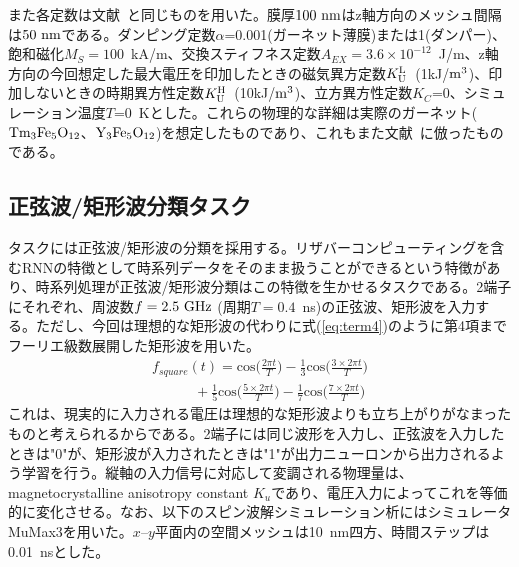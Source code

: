 \documentclass[a4j, twocolumn]{jsarticle}
\begin{document}
また各定数は文献~\cite{Nakane2018IEEEAccess:_Reser_Compu_with_spin_waves_Excit_in_a_Garne_film}と同じものを用いた。膜厚$100~\rm{nm}$はz軸方向のメッシュ間隔は$50~\rm{nm}$である。ダンピング定数$\alpha$=0.001(ガーネット薄膜)または1(ダンパー)、飽和磁化$M_S=100$~kA/m、交換スティフネス定数$A_{EX}=3.6\times10^{-12}$~J/m、z軸方向の今回想定した最大電圧を印加したときの磁気異方定数$K^{\rm L}_{\rm{U}}$~(1kJ/${\rm m^{3}}$)、印加しないときの時期異方性定数$K^{\rm H}_{\rm U}$~(10kJ/${\rm m^{3}}$)、立方異方性定数$K_{C}$=0、シミュレーション温度$T$=0~Kとした。これらの物理的な詳細は実際のガーネット(${\rm Tm_{3}Fe_{5}O_{12}}$、${\rm Y_{3}Fe_{5}O_{12}}$)を想定したものであり、これもまた文献~\cite{Nakane2018IEEEAccess:_Reser_Compu_with_spin_waves_Excit_in_a_Garne_film}に倣ったものである。

\subsection{正弦波/矩形波分類タスク}
\label{subsec:task}

タスクには正弦波/矩形波の分類を採用する。リザバーコンピューティングを含むRNNの特徴として時系列データをそのまま扱うことができるという特徴があり、時系列処理が正弦波/矩形波分類はこの特徴を生かせるタスクである。2端子にそれぞれ、周波数$f=2.5~\rm{GHz}$ (周期$T=0.4$~ns)の正弦波、矩形波を入力する。ただし、今回は理想的な矩形波の代わりに式(\ref{eq:term4})のように第4項までフーリエ級数展開した矩形波を用いた。
\begin{eqnarray}
	f_{square}(t) = \mathrm{cos}\biggl( \frac{2{\pi}t}{T}\biggr)-\frac{1}{3}\mathrm{cos}\biggl(\frac{3\times2{\pi}t}{T}\biggr) \nonumber \\
	\quad\quad\quad  +\frac{1}{5}\mathrm{cos}\biggl(\frac{5\times2{\pi}t}{T}\biggr)-\frac{1}{7}\mathrm{cos} \biggl(\frac{7\times2{\pi}t}{T}\biggr)
\label{eq:term4}
\end{eqnarray}
これは、現実的に入力される電圧は理想的な矩形波よりも立ち上がりがなまったものと考えられるからである。2端子には同じ波形を入力し、正弦波を入力したときは"0"が、矩形波が入力されたときは"1"が出力ニューロンから出力されるよう学習を行う。縦軸の入力信号に対応して変調される物理量は、magnetocrystalline anisotropy constant $K_{u}$であり、電圧入力によってこれを等価的に変化させる。なお、以下のスピン波解シミュレーション析にはシミュレータMuMax3を用いた\cite{Vansteenkiste2014AIP:_the_desig_and_verif_of_MuMax}。$x$--$y$平面内の空間メッシュは10~nm四方、時間ステップは0.01~nsとした。
\end{document}
